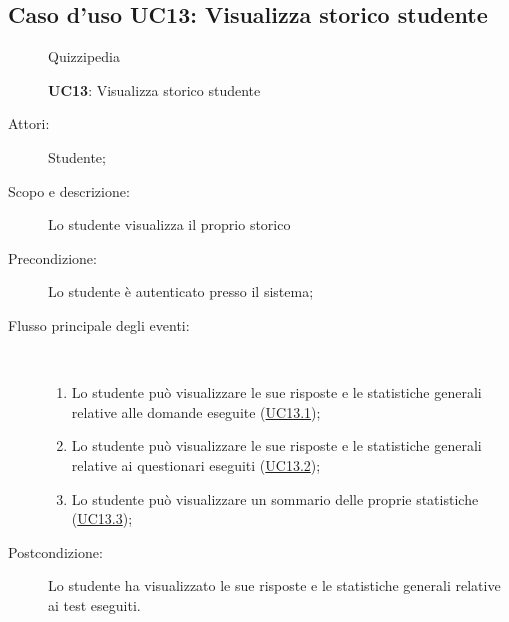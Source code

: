 \subsection{Caso d'uso UC13: Visualizza storico studente}
\begin{figure}[H]
	\centering
	\begin{resizedtikzpicture}{\textwidth}
		\begin{umlsystem}[x=0, fill=lightgray!20]{Quizzipedia}
		\end{umlsystem}
	\end{resizedtikzpicture}
	\caption{\textbf{UC13}: Visualizza storico studente}
	\label{UC13}
\end{figure}
\begin{description}
	\item[Attori:] Studente;
	\item[Scopo e descrizione:] Lo studente visualizza il proprio storico
	\item[Precondizione:] Lo studente è autenticato presso il sistema;
	
	\item[Flusso principale degli eventi:] \ 
	\begin{enumerate}
		\item Lo studente può visualizzare le sue risposte e le statistiche generali relative alle domande eseguite (\hyperlink{UC13.1}{UC13.1});
		\item Lo studente può visualizzare le sue risposte e le statistiche generali relative ai questionari eseguiti (\hyperlink{UC13.2}{UC13.2});
		\item Lo studente può visualizzare un sommario delle proprie statistiche (\hyperlink{UC13.3}{UC13.3});
		
	\end{enumerate}
	\item[Postcondizione:] Lo studente ha visualizzato le sue risposte e le statistiche generali relative ai test eseguiti.
\end{description}
\hypertarget{UC13.1}{}
